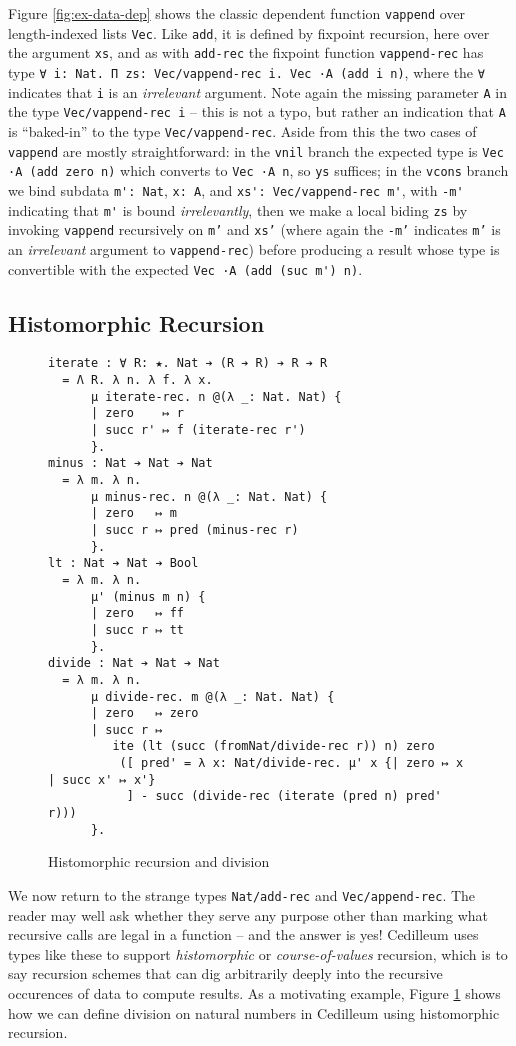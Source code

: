 \documentclass{article}
\begin{document}
Figure \ref{fig:ex-data-dep} shows the classic dependent function
\texttt{vappend} over length-indexed lists \texttt{Vec}. Like \texttt{add}, it is
defined by fixpoint recursion, here over the argument \texttt{xs}, and as with
\texttt{add-rec} the fixpoint function \texttt{vappend-rec} has type
\verb;∀ i: Nat. Π zs: Vec/vappend-rec i. Vec ·A (add i n);, where the \texttt{∀}
indicates that \texttt{i} is an \textit{irrelevant} argument. Note again the
missing parameter \texttt{A} in the type \texttt{Vec/vappend-rec i} -- this is
not a typo, but rather an indication that \texttt{A} is ``baked-in'' to the type
\texttt{Vec/vappend-rec}. Aside from this the two cases of \texttt{vappend} are
mostly straightforward: in the \texttt{vnil} branch the expected type is
\verb;Vec ·A (add zero n); which converts to \verb;Vec ·A n;, so \texttt{ys}
suffices; in the \texttt{vcons} branch we bind subdata \verb;m': Nat;,
\verb;x: A;, and \verb;xs': Vec/vappend-rec m';, with \verb;-m'; indicating
that \verb;m'; is bound \textit{irrelevantly}, then we make a local biding
\texttt{zs} by invoking \verb;vappend; recursively on \texttt{m'} and
\texttt{xs'} (where again the \texttt{-m'} indicates \texttt{m'} is an
\textit{irrelevant} argument to \texttt{vappend-rec}) before producing a result whose type is
convertible with the expected \verb;Vec ·A (add (suc m') n);.

\subsection{Histomorphic Recursion}
\begin{figure}[h]
\begin{verbatim}
iterate : ∀ R: ★. Nat ➔ (R ➔ R) ➔ R ➔ R
  = Λ R. λ n. λ f. λ x.
      μ iterate-rec. n @(λ _: Nat. Nat) {
      | zero    ↦ r
      | succ r' ↦ f (iterate-rec r') 
      }.
minus : Nat ➔ Nat ➔ Nat
  = λ m. λ n.
      μ minus-rec. n @(λ _: Nat. Nat) {
      | zero   ↦ m
      | succ r ↦ pred (minus-rec r)
      }.
lt : Nat ➔ Nat ➔ Bool
  = λ m. λ n.
      μ' (minus m n) {
      | zero   ↦ ff
      | succ r ↦ tt
      }.
divide : Nat ➔ Nat ➔ Nat
  = λ m. λ n.
      μ divide-rec. m @(λ _: Nat. Nat) {
      | zero   ↦ zero
      | succ r ↦
         ite (lt (succ (fromNat/divide-rec r)) n) zero
          ([ pred' = λ x: Nat/divide-rec. μ' x {| zero ↦ x | succ x' ↦ x'}
           ] - succ (divide-rec (iterate (pred n) pred' r)))
      }.
\end{verbatim}
  \caption{Histomorphic recursion and division}
  \label{fig:ex-data-div}
\end{figure}
We now return to the strange types \verb;Nat/add-rec; and \verb;Vec/append-rec;.
The reader may well ask whether they serve any purpose other than marking what
recursive calls are legal in a function -- and the answer is yes! Cedilleum uses
types like these to support \textit{histomorphic} or \textit{course-of-values}
recursion, which is to say recursion schemes that can dig arbitrarily deeply
into the recursive occurences of data to compute results. As a motivating
example, Figure \ref{fig:ex-data-div} shows how we can define division on
natural numbers in Cedilleum using histomorphic recursion.
\end{document}
